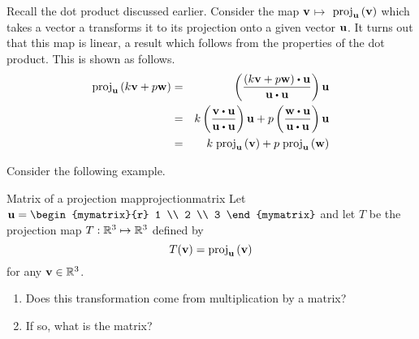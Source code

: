 Recall the dot product discussed earlier. Consider the map ${\bf v}$\textbf{$\mapsto $}
$\mbox{proj}_{{\bf u}}\left( {\bf v}\right) $ which takes a vector a transforms it to its projection onto a given vector ${\bf u}$. It turns out that
this map is linear, a result which follows from the properties of the
dot product. This is shown as follows.
\begin{eqnarray*}
\func{proj}_{\vect{u}}\left( k \vect{v}+ p \vect{w}\right)
&=&\left( \vspace{0.05in}\frac{(k \vect{v}+ p \vect{w})\dotprod \vect{u}}{
\vect{u}\dotprod \vect{u}}\right) \vect{u} \\
&=& k  \left( \vspace{0.05in}\frac{
\vect{v}\dotprod \vect{u}}{\vect{u}\dotprod \vect{u}}\right) \vect{u}+p \left( \vspace{
0.05in}\frac{\vect{w}\dotprod \vect{u}}{\vect{u}\dotprod \vect{u}}\right) \vect{u} \\
&=& k \; \func{proj}_{\vect{u}}\left( \vect{v}\right) +p \; \func{proj}
_{\vect{u}}\left( \vect{w}\right) 
\end{eqnarray*}

Consider the following example.

\begin{example}{Matrix of a projection map}{projectionmatrix}
Let $\vect{u} = \begin{mymatrix}{r}
1 \\
2 \\
3
\end{mymatrix}$ and let $T$ be the projection map $T: \mathbb{R}^3 \mapsto \mathbb{R}^3$ defined by 
\[
T({\bf v}) = \mbox{proj}_{{\bf u}}\left( {\bf v}\right)
\]
for any ${\bf v} \in \mathbb{R}^3$.  
\begin{enumerate}
\item Does this transformation come from
multiplication by a matrix?
\item If so, what is the matrix?
\end{enumerate}
\end{example}

